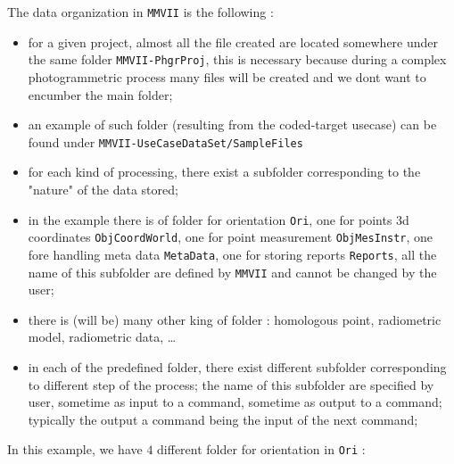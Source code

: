 The data organization in {\tt MMVII} is the following :

\begin{itemize}
     \item for a given project, almost all the file created are located somewhere under
           the same folder {\tt MMVII-PhgrProj},  this is necessary because during a complex 
           photogrammetric process many files will be created and we dont want to encumber
           the main folder;

     \item an example of such folder (resulting from the coded-target usecase) can be
	     found under {\tt MMVII-UseCaseDataSet/SampleFiles}

     \item for each kind of processing, there exist a subfolder corresponding to the "nature"
            of the data stored;

    \item  in the example there is of folder for orientation {\tt Ori}, one for points 3d coordinates
    {\tt ObjCoordWorld}, one for point measurement
	   {\tt ObjMesInstr}, one fore handling meta data {\tt MetaData}, one for storing reports
           {\tt Reports}, all the name of this subfolder are defined by {\tt MMVII} and cannot be changed
            by the user;

    \item there is (will be) many other king of folder : homologous point, radiometric model, radiometric data,
           \dots

     \item in each of the predefined folder, there exist different subfolder corresponding to different step
           of the process; the name of this subfolder are specified by user, sometime as input to a command,
	   sometime as output to a command; typically the output a command being the input of the next command;
\end{itemize}

In this example, we have $4$ different folder for orientation in {\tt Ori} :

